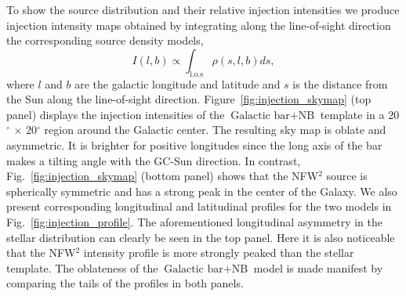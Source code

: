 \documentclass[doublespace,nopageskip]{VTthesis} %
\begin{document}

To show the source distribution and their relative injection intensities we produce injection intensity maps obtained by integrating along the line-of-sight direction the corresponding source density models,
\begin{equation}
  \label{eq:j_factor}
  I(l,b) \propto \int_{\text{l.o.s}} \rho(s,l,b) ds,
\end{equation}
where $l$ and $b$ are the galactic longitude and latitude and $s$ is the distance from the Sun along the line-of-sight direction.
Figure~\ref{fig:injection_skymap} (top panel) displays the injection intensities of the $\mbox{Galactic bar}+\mbox{NB}$ template in a 20$^\circ$ $\times$ 20$^\circ$ region around the Galactic center. The resulting sky map is oblate and asymmetric. It is brighter for positive longitudes since the long axis of the bar makes a tilting angle with the GC-Sun direction. In contrast, Fig.~\ref{fig:injection_skymap} (bottom panel) shows that the NFW$^2$ source is spherically symmetric and has a strong peak in the center of the Galaxy. We also present corresponding longitudinal and latitudinal profiles for the two models in Fig.~\ref{fig:injection_profile}. The aforementioned longitudinal asymmetry in the stellar distribution can clearly be seen in the top panel. Here it is also noticeable that the NFW$^2$ intensity profile is more strongly peaked than the stellar template. The oblateness of the $\mbox{Galactic bar}+\mbox{NB}$ model is made manifest by comparing the tails of the profiles in both panels.
\end{document}
